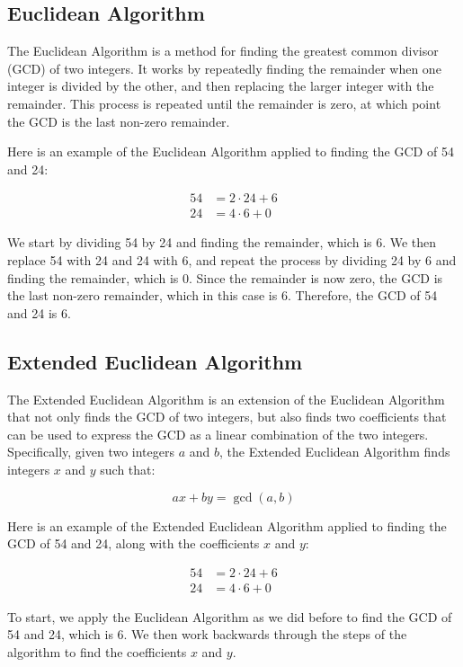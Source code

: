 \documentclass[11pt]{article}
\begin{document}
\subsection{Euclidean Algorithm}
The Euclidean Algorithm is a method for finding the greatest common divisor (GCD) of two integers. It works by repeatedly finding the remainder when one integer is divided by the other, and then replacing the larger integer with the remainder. This process is repeated until the remainder is zero, at which point the GCD is the last non-zero remainder.

Here is an example of the Euclidean Algorithm applied to finding the GCD of 54 and 24:

\begin{align*}
	54 & = 2 \cdot 24 + 6 \\
	24 & = 4 \cdot 6 + 0 \
\end{align*}

We start by dividing 54 by 24 and finding the remainder, which is 6. We then replace 54 with 24 and 24 with 6, and repeat the process by dividing 24 by 6 and finding the remainder, which is 0. Since the remainder is now zero, the GCD is the last non-zero remainder, which in this case is 6. Therefore, the GCD of 54 and 24 is 6.

\subsection{Extended Euclidean Algorithm}
The Extended Euclidean Algorithm is an extension of the Euclidean Algorithm that not only finds the GCD of two integers, but also finds two coefficients that can be used to express the GCD as a linear combination of the two integers. Specifically, given two integers $a$ and $b$, the Extended Euclidean Algorithm finds integers $x$ and $y$ such that:

$$ax + by = \gcd(a, b)$$

Here is an example of the Extended Euclidean Algorithm applied to finding the GCD of 54 and 24, along with the coefficients $x$ and $y$:

\begin{align*}
	54 & = 2 \cdot 24 + 6 \\
	24 & = 4 \cdot 6 + 0 \
\end{align*}

To start, we apply the Euclidean Algorithm as we did before to find the GCD of 54 and 24, which is 6. We then work backwards through the steps of the algorithm to find the coefficients $x$ and $y$.
\end{document}
